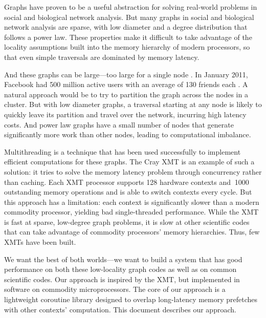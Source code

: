 \documentclass{acm_proc_article-sp}
\begin{document}
Graphs have proven to be a useful abstraction for solving real-world
problems in social and biological network analysis. But many graphs in
social and biological network analysis are sparse, with low diameter
and a degree distribution that follows a power law. These properties
make it difficult to take advantage of the locality assumptions built
into the memory hierarchy of modern processors, so that even simple
traversals are dominated by memory latency.

And these graphs can be large---too large for a single node . In January 2011, Facebook had 500 million active users with an average of
130 friends each \cite{Facebook:2011p91}. A natural approach would be
to try to partition the graph across the nodes in a cluster. But with
low diameter graphs, a traversal starting at any node is likely to
quickly leave its partition and travel over the network, incurring
high latency costs. And power law graphs have a small number of nodes
that generate significantly more work than other nodes, leading to
computational imbalance.



Multithreading is a technique that has been used successfully to
implement efficient computations for these graphs. The Cray XMT is an
example of such a solution: it tries to solve the memory latency
problem through concurrency rather than caching. Each XMT processor
supports 128 hardware contexts and $~$1000 outstanding memory
operations and is able to switch contexts every cycle. But this
approach has a limitation: each context is significantly slower than a
modern commodity processor, yielding bad single-threaded
performance. While the XMT is fast at sparse, low-degree graph
problems, it is slow at other scientific codes that can take advantage
of commodity processors' memory hierarchies. Thus, few XMTs have been
built.

We want the best of both worlds---we want to build a system that has
good performance on both these low-locality graph codes as well as on
common scientific codes. Our approach is inspired by the XMT, but
implemented in software on commodity microprocessors. The core of our
approach is a lightweight coroutine library designed to overlap
long-latency memory prefetches with other contexts' computation. This
document describes our approach.
\end{document}
